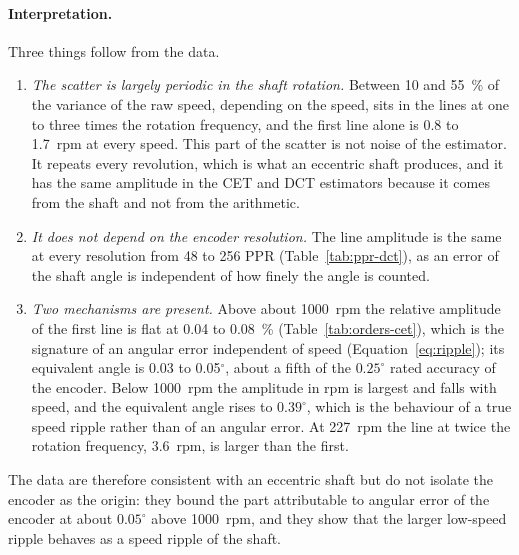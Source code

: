 \paragraph{Interpretation.}
Three things follow from the data.
\begin{enumerate}
    \item \emph{The scatter is largely periodic in the shaft rotation.} Between 10 and 55~\% of the variance of the raw speed, depending on the speed, sits in the lines at one to three times the rotation frequency, and the first line alone is 0.8 to 1.7~rpm at every speed. This part of the scatter is not noise of the estimator. It repeats every revolution, which is what an eccentric shaft produces, and it has the same amplitude in the CET and DCT estimators because it comes from the shaft and not from the arithmetic.
    \item \emph{It does not depend on the encoder resolution.} The line amplitude is the same at every resolution from 48 to 256 PPR (Table~\ref{tab:ppr-dct}), as an error of the shaft angle is independent of how finely the angle is counted.
    \item \emph{Two mechanisms are present.} Above about 1000~rpm the relative amplitude of the first line is flat at 0.04 to 0.08~\% (Table~\ref{tab:orders-cet}), which is the signature of an angular error independent of speed (Equation~\ref{eq:ripple}); its equivalent angle is 0.03 to 0.05$^{\circ}$, about a fifth of the $0.25^{\circ}$ rated accuracy of the encoder. Below 1000~rpm the amplitude in rpm is largest and falls with speed, and the equivalent angle rises to $0.39^{\circ}$, which is the behaviour of a true speed ripple rather than of an angular error. At 227~rpm the line at twice the rotation frequency, 3.6~rpm, is larger than the first.
\end{enumerate}
The data are therefore consistent with an eccentric shaft but do not isolate the encoder as the origin: they bound the part attributable to angular error of the encoder at about $0.05^{\circ}$ above 1000~rpm, and they show that the larger low-speed ripple behaves as a speed ripple of the shaft.

